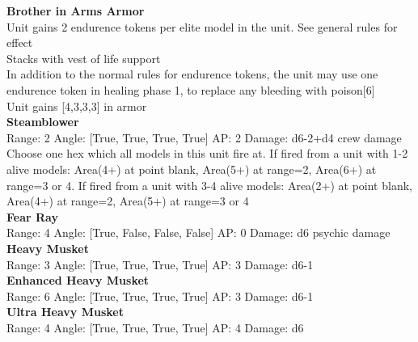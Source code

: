 {\bf Brother in Arms Armor } \\

Unit gains 2 endurence tokens per elite model in the unit. See general rules for effect\\ 
Stacks with vest of life support\\ 
In addition to the normal rules for endurence tokens, the unit may use one endurence token in healing phase 1, to replace any bleeding with poison[6]\\ 
Unit gains [4,3,3,3] in armor\\ 





{\bf Steamblower } \\



Range: 2  Angle: [True, True, True, True] AP: 2 Damage: d6-2+d4 crew damage \\
Choose one hex which all models in this unit fire at. If fired from a unit with 1-2 alive models: Area(4+) at point blank, Area(5+) at range=2, Area(6+) at range=3 or 4. If fired from a unit with 3-4 alive models: Area(2+) at point blank, Area(4+) at range=2, Area(5+) at range=3 or 4\\ 




{\bf Fear Ray } \\



Range: 4  Angle: [True, False, False, False] AP: 0 Damage: d6 psychic damage \\




{\bf Heavy Musket } \\



Range: 3  Angle: [True, True, True, True] AP: 3 Damage: d6-1 \\




{\bf Enhanced Heavy Musket } \\



Range: 6  Angle: [True, True, True, True] AP: 3 Damage: d6-1 \\




{\bf Ultra Heavy Musket } \\



Range: 4  Angle: [True, True, True, True] AP: 4 Damage: d6 \\




